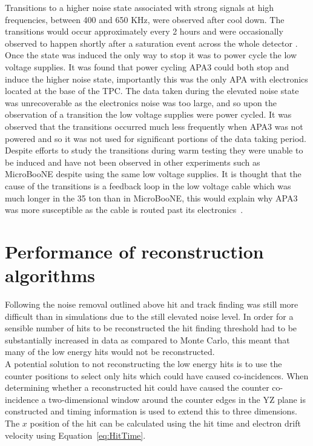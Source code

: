 Transitions to a higher noise state associated with strong signals at high frequencies, between 400 and 650 KHz, were observed after cool down. The transitions would occur approximately every 2 hours and were occasionally observed to happen shortly after a saturation event across the whole detector \citep{35tonNoiseMeeting}. Once the state was induced the only way to stop it was to power cycle the low voltage supplies. It was found that power cycling APA3 could both stop and induce the higher noise state, importantly this was the only APA with electronics located at the base of the TPC. The data taken during the elevated noise state was unrecoverable as the electronics noise was too large, and so upon the observation of a transition the low voltage supplies were power cycled. It was observed that the transitions occurred much less frequently when APA3 was not powered and so it was not used for significant portions of the data taking period. Despite efforts to study the transitions during warm testing they were unable to be induced and have not been observed in other experiments such as MicroBooNE despite using the same low voltage supplies. It is thought that the cause of the transitions is a feedback loop in the low voltage cable which was much longer in the 35 ton than in MicroBooNE, this would explain why APA3 was more susceptible as the cable is routed past its electronics~\citep{35tonNoiseDoc}.

\section{Performance of reconstruction algorithms} \label{sec:DataAlgs}  %
Following the noise removal outlined above hit and track finding was still more difficult than in simulations due to the still elevated noise level. In order for a sensible number of hits to be reconstructed the hit finding threshold had to be substantially increased in data as compared to Monte Carlo, this meant that many of the low energy hits would not be reconstructed. \\

A potential solution to not reconstructing the low energy hits is to use the counter positions to select only hits which could have caused co-incidences. When determining whether a reconstructed hit could have caused the counter co-incidence a two-dimensional window around the counter edges in the YZ plane is constructed and timing information is used to extend this to three dimensions.  The $x$ position of the hit can be calculated using the hit time and electron drift velocity using Equation~\ref{eq:HitTime}.

